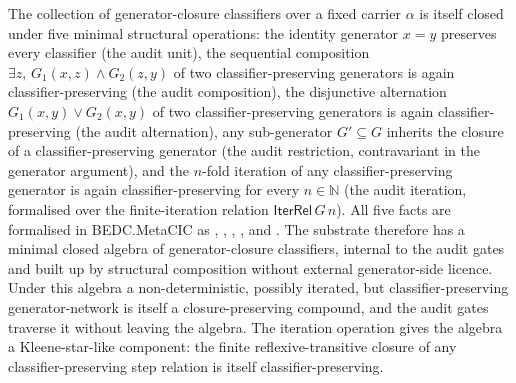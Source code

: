 \begin{principle}
\label{prin:certificate-closure-classifier-algebra}
The collection of generator-closure classifiers over a fixed carrier $\alpha$ is itself closed under five minimal structural operations: the identity generator $x = y$ preserves every classifier (the audit unit), the sequential composition $\exists z,\, G_1(x, z) \wedge G_2(z, y)$ of two classifier-preserving generators is again classifier-preserving (the audit composition), the disjunctive alternation $G_1(x, y) \vee G_2(x, y)$ of two classifier-preserving generators is again classifier-preserving (the audit alternation), any sub-generator $G' \subseteq G$ inherits the closure of a classifier-preserving generator (the audit restriction, contravariant in the generator argument), and the $n$-fold iteration of any classifier-preserving generator is again classifier-preserving for every $n \in \mathbb{N}$ (the audit iteration, formalised over the finite-iteration relation $\mathsf{IterRel}\,G\,n$). All five facts are formalised in BEDC.MetaCIC as , , , , and . The substrate therefore has a minimal closed algebra of generator-closure classifiers, internal to the audit gates and built up by structural composition without external generator-side licence. Under this algebra a non-deterministic, possibly iterated, but classifier-preserving generator-network is itself a closure-preserving compound, and the audit gates traverse it without leaving the algebra. The iteration operation gives the algebra a Kleene-star-like component: the finite reflexive-transitive closure of any classifier-preserving step relation is itself classifier-preserving.
\end{principle}

